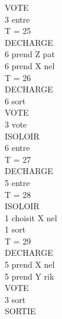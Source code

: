 \documentclass[12pt]{article} %
\begin{document}
\begin{multicols}{3}
{			\hspace*{5mm} VOTE\\
			\hspace*{12mm} 3 entre\\
			T = 25\\
			\hspace*{5mm} DECHARGE\\
			\hspace*{12mm} 6 prend Z pat\\
			\hspace*{12mm} 6 prend X nel\\
			T = 26\\
			\hspace*{5mm} DECHARGE\\
			\hspace*{12mm} 6 sort\\
			\hspace*{5mm} VOTE\\
			\hspace*{12mm} 3 vote\\
			\hspace*{5mm} ISOLOIR\\
			\hspace*{12mm} 6 entre\\
			T = 27\\
			\hspace*{5mm} DECHARGE\\
			\hspace*{12mm} 5 entre\\
			T = 28\\
			\hspace*{5mm} ISOLOIR\\
			\hspace*{12mm} 1 choisit X nel\\
			\hspace*{12mm} 1 sort\\
			T = 29\\
			\hspace*{5mm} DECHARGE\\
			\hspace*{12mm} 5 prend X nel\\
			\hspace*{12mm} 5 prend Y rik\\
			\hspace*{5mm} VOTE\\
			\hspace*{12mm} 3 sort\\
			\hspace*{5mm} SORTIE\\
}
\end{multicols}
\end{document}
